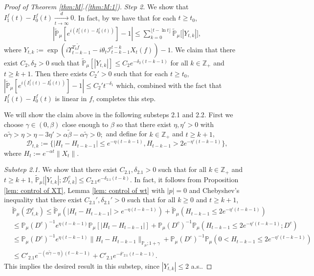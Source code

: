 \documentclass[12pt,a4paper]{amsart}
\theoremstyle{plain}
\theoremstyle{definition}
\numberwithin{equation}{section}
\begin{document}
\begin{proof}[Proof of Theorem \ref{thm:M}.(\ref{thm:M:1})]
  \emph{Step 2.} We show that $I^f_1(t) - I^f_0(t) \xrightarrow[t\to \infty]{d} 0$.
  In fact,  by \cite[Lemma 3.4.3]{Durrett2010Probability} we have that for each $t\geq t_0$,
  \begin{align}
    \label{eq:PM:S:1}
    |\mathbb{\widetilde{P}}_{\mu}[e^{i (I^f_1(t) - I^f_0(t) ) }] - 1|
    \leq \sum_{k=0}^{\lfloor t-\ln t \rfloor}\mathbb{\widetilde{P}}_{\mu}\big[|Y_{t,k}|\big],
  \end{align}
  where $ Y_{t,k} := \exp(i \Upsilon_{t-k-1}^{T_{k} \tilde f} - i\theta_t \mathcal I_{t-k-1}^{t-k} X_t(f)) - 1. $
  We claim that there exist $C_2, \delta_2>0$ such that \(\widetilde {\mathbb P}_\mu [|Y_{t,k}|] \leq C_2 e^{-\delta_2 (t-k-1)}\) for all $k\in \mathbb Z_+$ and $t\geq k+1$.
  Then  there exists $C_2'>0$ such that for each  $t \geq t_0$, $|\mathbb{\widetilde{P}}_{\mu}[e^{i (I^f_1(t)- I^f_0(t))}]-1| \leq C_2't^{-\delta_1}$  which, combined with the fact that $I^f_1(t) - I^f_0(t)$ is linear in $f$, completes this step.

 We will show the claim above  in the following substeps 2.1 and 2.2.
  First we choose $\gamma \in (0,\beta)$ close enough to $\beta$ so that there exist $\eta,\eta'>0$ with $ \alpha \tilde \gamma > \eta > \eta - 3\eta' > \alpha \tilde \beta - \alpha \tilde \gamma > 0;$ and define for  $k \in \mathbb Z_+$ and $t\geq k+1$,
  \[
    \mathcal{D}_{t,k}
    :=\{|H_t-H_{t-k-1}|\leq  e^{-\eta (t-k-1)}, H_{t-k-1}> 2e^{-\eta' (t-k-1)}\},
  \]
  where $H_t := e^{-\alpha t}\|X_t\|$.

  \emph{Substep 2.1.} We show that there exist $C_{2.1},\delta_{2.1} >0$ such that for all $k \in \mathbb Z_+$ and $t\geq k+1$, $ \mathbb{\widetilde{P}}_{\mu} \big[ |Y_{t,k}| ;\mathcal{D}^c_{t,k} \big] \leq C_{2.1} e^{-\delta_{2.1} (t-k)}.$
  In fact, it follows from Proposition \ref{lem: control of XT}, Lemma \ref{lem: control of wt} with $|p|=0$ and Chebyshev's inequality that there exist $C_{2.1}', \delta_{2.1}'>0$ such that for all $k \geq 0$ and $t\geq k+1$,
  \begin{align}
    \label{eq: prob of Dtkc}
    & \mathbb{\widetilde{P}}_{\mu}(\mathcal{D}_{t,k}^c)
    \leq \mathbb{\widetilde{P}}_{\mu}(|H_t-H_{t-k-1}| > e^{-\eta (t-k-1)})+\mathbb{\widetilde{P}}_{\mu}(H_{t-k-1}\leq 2e^{-\eta'(t-k-1)}) \\
    & \leq \mathbb{P}_{\mu}(D^c)^{-1}e^{\eta(t-k-1)}\mathbb{P}_{\mu}[|H_t-H_{t-k-1}|] +  \mathbb{P}_{\mu}(D^c)^{-1} \mathbb P_\mu(H_{t-k-1}\leq 2e^{-\eta'(t-k-1)}; D^c) \\
    & \leq \mathbb{P}_{\mu}(D^c)^{-1}  e^{\eta(t-k-1)}\|H_t - H_{t-k-1}\|_{\mathbb P_\mu; 1+\gamma} + \mathbb{P}_{\mu}(D^c)^{-1} \mathbb P_\mu(0<H_{t-k-1}\leq 2e^{-\eta'(t-k-1)}) \\
    & \leq C'_{2.1} e^{-(\alpha \tilde \gamma - \eta)(t-k-1)}+C'_{2.1} e^{-\delta'_{2.1}(t-k-1)}.
  \end{align}
  This implies the desired result in this substep, since $|Y_{t,k}| \leq 2$ a.s..


\end{proof}
\end{document}
